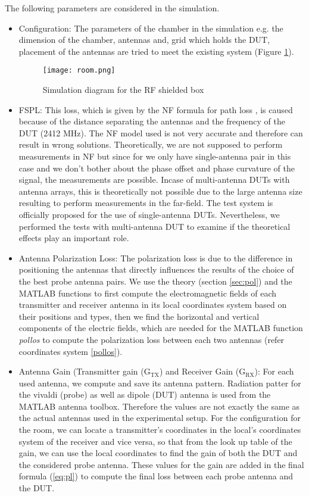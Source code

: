   The following parameters are considered in the simulation.
\begin{itemize}
  \item Configuration: The parameters of the chamber in the simulation e.g. the dimension of the chamber, antennas and, grid which holds the \acs{DUT}, placement of the antennas are tried to meet the existing system (Figure \ref{fig:room}). 
  \begin{figure}[H]
\texttt{[image: room.png]}
\caption{Simulation diagram for the \acs{RF} shielded box}
\label{fig:room} 
\end{figure}

  \item \acf{FSPL}: This loss, which is given by the \acf{NF} formula for path loss \cite{schantz}, is caused because of the distance separating the antennas and the frequency of the \acs{DUT} (2412 MHz). The \acs{NF} model used is not very accurate and therefore can result in wrong solutions. Theoretically, we are not supposed to perform measurements in \acf{NF} but since for we only have single-antenna pair in this case and we don't bother about the phase offset and phase curvature of the signal, the measurements are possible. Incase of multi-antenna \acsp{DUT} with antenna arrays, this is theoretically not possible due to the large antenna size resulting to perform measurements in the far-field. The test system is officially proposed for the use of single-antenna \acsp{DUT}. Nevertheless, we performed the tests with multi-antenna \acs{DUT} to examine if the theoretical effects play an important role.
 
  \item Antenna Polarization Loss: The polarization loss is due to the difference in positioning the antennas that directly influences the results of the choice of the best probe antenna pairs. We use the theory (section \ref{sec:pol}) and the MATLAB\textregistered{} functions to first compute the electromagnetic fields of each transmitter and receiver antenna in its local coordinates system based on their positions and types, then we find the horizontal and vertical components of the electric fields, which are needed for the MATLAB\textregistered{} function \textit{pollos} to compute the polarization loss between each two antennas (refer coordinates system \ref{pollos}).
  
  \item Antenna Gain (Transmitter gain ($\mbox{G}_{\mbox{TX}}$) and Receiver Gain ($\mbox{G}_{\mbox{RX}}$): For each used antenna, we compute and save its antenna pattern. Radiation patter for the vivaldi (probe) as well as dipole (\acs{DUT}) antenna is used from the MATLAB\textregistered{} antenna toolbox. Therefore the values are not exactly the same as the actual antennas used in the experimental setup. For the configuration for the room, we can locate a transmitter's coordinates in the local's coordinates system of the receiver and vice versa, so that from the look up table of the gain, we can use the local coordinates to find the gain of both the \acs{DUT} and the considered probe antenna. These values for the gain are added in the final formula  (\ref{eq:pl}) to compute the final loss between each probe antenna and the \acs{DUT}.
  

\end{itemize}
